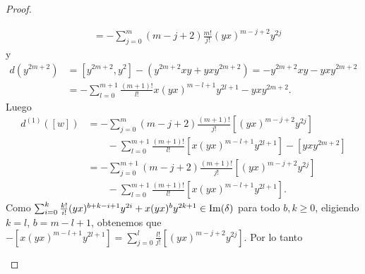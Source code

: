 \documentclass[fleqn,../tesis.tex]{subfiles}
\begin{document}
\begin{proof}
\begin{itemize}
\begin{align*}
				&= -\sum_{j = 0}^m(m - j + 2)\frac{m!}{j!}(yx)^{m -j + 2}y^{2j}
			\end{align*}
			y
			\begin{align*}
				d(y^{2m + 2}) &= \left[y^{2m + 2}, y^2\right] - (y^{2m +2}xy + yxy^{2m + 2}) = - y^{2m +2}xy - yxy^{2m + 2} \\
				&= -\sum_{l = 0}^{m + 1}\frac{(m + 1)!}{l!}x(yx)^{m - l + 1}y^{2l + 1} - yxy^{2m + 2}.
			\end{align*}
			Luego
			\begin{align*}
				d^{(1)}(\left[w\right]) &=
					-\sum_{j = 0}^m(m - j + 2)\frac{(m + 1)!}{j!}\left[(yx)^{m -j + 2}y^{2j}\right]\\
				&\qquad -\sum_{l = 0}^{m + 1}\frac{(m + 1)!}{l!}\left[x(yx)^{m - l + 1}y^{2l + 1}\right]
						- \left[yxy^{2m + 2}\right]\\
				&= -\sum_{j = 0}^{m + 1}(m - j + 2)\frac{(m + 1)!}{j!}\left[(yx)^{m -j + 2}y^{2j}\right]\\
				& \qquad-\sum_{l = 0}^{m + 1}\frac{(m + 1)!}{l!}\left[x(yx)^{m - l + 1}y^{2l + 1}\right].			
			\end{align*}
			Como $\sum_{i = 0}^k\frac{k!}{i!}(yx)^{b + k - i + 1}y^{2i} + x(yx)^by^{2k + 1} \in \operatorname{Im}(\delta)$
			para todo $b,k \geq 0$, eligiendo $k = l$, $b = m - l + 1$, obtenemos que
				$-\left[x(yx)^{m - l + 1}y^{2l + 1}\right]
					= \sum_{j = 0}^l\frac{l!}{j!}\left[(yx)^{m - j + 2}y^{2j}\right].$
			Por lo tanto
			

\end{itemize}
\end{proof}
\end{document}

